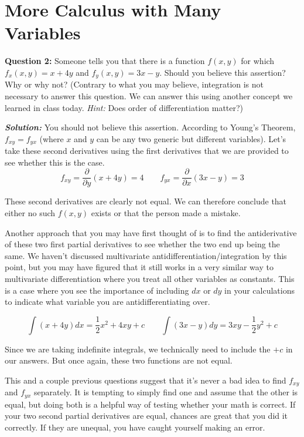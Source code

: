 \documentclass[10pt]{amsart}
\begin{document}
\section{More Calculus with Many Variables}

\textbf{Question 2:} Someone tells you that there is a function $f(x,y)$ for which $f_x(x,y) = x + 4y$ and $f_y(x,y) = 3x-y$. Should you believe this assertion? Why or why not? (Contrary to what you may believe, integration is not necessary to answer this question. We can answer this using another concept we learned in class today. \textit{Hint:} Does order of differentiation matter?)

\textbf{\textit{Solution:}} You should not believe this assertion. According to Young's Theorem, $f_{xy} = f_{yx}$ (where $x$ and $y$ can be any two generic but different variables). Let's take these second derivatives using the first derivatives that we are provided to see whether this is the case.
\medskip
$$f_{xy} = \frac{\partial}{\partial y} (x+4y) = 4 \qquad f_{yx} = \frac{\partial}{\partial x} (3x-y) = 3$$

These second derivatives are clearly not equal. We can therefore conclude that either no such $f(x,y)$ exists or that the person made a mistake. 

Another approach that you may have first thought of is to find the antiderivative of these two first partial derivatives to see whether the two end up being the same. We haven't discussed multivariate antidifferentiation/integration by this point, but you may have figured that it still works in a very similar way to multivariate differentiation where you treat all other variables as constants. This is a case where you see the importance of including $dx$ or $dy$ in your calculations to indicate what variable you are antidifferentiating over.

$$\int (x + 4y) dx = \frac{1}{2}x^2 + 4xy + c \qquad \int (3x-y) dy = 3xy - \frac{1}{2}y^2 + c$$

Since we are taking indefinite integrals, we technically need to include the $+ c$ in our answers. But once again, these two functions are not equal.

This and a couple previous questions suggest that it's never a bad idea to find $f_{xy}$ and $f_{yx}$ separately. It is tempting to simply find one and assume that the other is equal, but doing both is a helpful way of testing whether your math is correct. If your two second partial derivatives are equal, chances are great that you did it correctly. If they are unequal, you have caught yourself making an error.
\medskip
\end{document}
